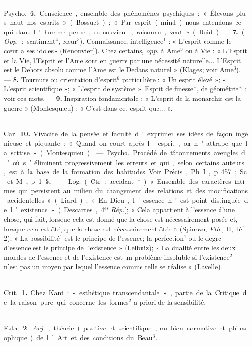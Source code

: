 \begin{itemize}[leftmargin=1cm, label=, itemsep=1pt]
— \si{Psycho.} {\bf 6.} Conscience, ensemble des phénomènes psychiques :
« Élevons plus haut nos esprits »
(Bossuet); « Par esprit (mind) nous
entendons ce qui dans l’homme
pense, se souvient, raisonne, veut »
(Reid). — {\bf 7.} ({\it Opp.} : sentiment$^4$,
cœur$^3$). Connaissance, intelligence$^1$ :
« L'esprit comme le cœur a ses idoles»
(Renouvier)). Chez certains, {\it opp.} à
Ame$^3$ ou à Vie : « L'Esprit et la Vie,
l'Esprit et l'Ame sont en guerre par
une nécessité naturelle... L'Esprit
est le Dehors absolu comme l’Ame
est le Dedans naturel » (Klages;
voir Ame$^3$). — {\bf 8.} Tournure ou orientation d’esprit$^6$ particulière : « Un
esprit élevé »; « L'esprit scientifique »; « L'esprit de système ».
Esprit de finesse*, de géométrie* :
voir ces mots. — {\bf 9.} Inspiration
fondamentale : « L’esprit de la monarchie est la guerre » (Montesquieu) ; « C’est dans cet esprit que... ».

— \si{Car.} {\bf 10.} Vivacité de la pensée
et faculté d'exprimer ses idées de
façon ingénieuse et piquante :
« Quand on court après l'esprit, on
n'attrape que la sottise » (Montesquieu).

 — \si{Psycho.} Procédé
de tâtonnements aveugles d’où s’éliminent progressivement les erreurs
et qui, selon certains auteurs, est à
la base de la formation des habitudes. Voir Précis, Ph. I, p. 457; Sc.
et M., p. 1 {\bf 5.}

 — \si{Log.} (Ctr. : accident*).
« Ensemble des caractères intimes
qui persistent au milieu du changement des relations et des modifications accidentelles » (Liard) : « En
Dieu, l'essence n’est point distinguée
de l’existence » (Descartes, 4$^\text{es}$ {\it Rép.});
« Cela appartient à l’essence d’une
chose, qui fait, lorsque cela est donné
que la chose est nécessairement
posée et, lorsque cela est ôté, que la
chose est nécessairement ôtée »
(Spinoza, {\it Eth.}, II, déf. 2); « La
possibilité$^1$ est le principe de l’essence; la perfection$^1$ ou le degré
d'essence est le principe de l'existence » (Leibniz); « La dualité entre
les deux mondes de l'essence et de
l'existence est un problème insoluble si l'existence$^2$ n’est pas un
moyen par lequel l'essence comme
telle se réalise » (Lavelle).

 — \si{Crit.} {\bf 1.} Chez
Kant : « esthétique transcendantale », partie de la Critique de la
raison pure qui concerne les formes$^2$
a priori de la sensibilité.

— \si{Esth.} {\bf 2.} {\it Auj.}, théorie (positive et scientifique, ou bien normative et philosophique) de l’Art et
des conditions du Beau$^3$.


\end{itemize}
